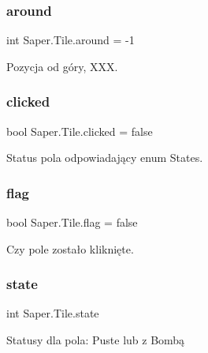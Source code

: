 \subsubsection{\texorpdfstring{around}{around}}
{\footnotesize\ttfamily int Saper.\+Tile.\+around = -\/1}



Pozycja od góry, X\+XX. 

\mbox{\label{class_saper_1_1_tile_a0b3e70fcbb158d0d48856f4f1c21e74c}} 
\subsubsection{\texorpdfstring{clicked}{clicked}}
{\footnotesize\ttfamily bool Saper.\+Tile.\+clicked = false}



Status pola odpowiadający enum States. 

\mbox{\label{class_saper_1_1_tile_a558d8534615ae6ddcbdbef636b0b7d16}} 
\subsubsection{\texorpdfstring{flag}{flag}}
{\footnotesize\ttfamily bool Saper.\+Tile.\+flag = false}



Czy pole zostało kliknięte. 

\mbox{\label{class_saper_1_1_tile_a59c61b4cd8fc0665533989c017b23688}} 
\subsubsection{\texorpdfstring{state}{state}}
{\footnotesize\ttfamily int Saper.\+Tile.\+state}



Statusy dla pola\+: Puste lub z Bombą 

\mbox{\label{class_saper_1_1_tile_af14b4a73e2ea580fe25cf29eba901f83}} 

